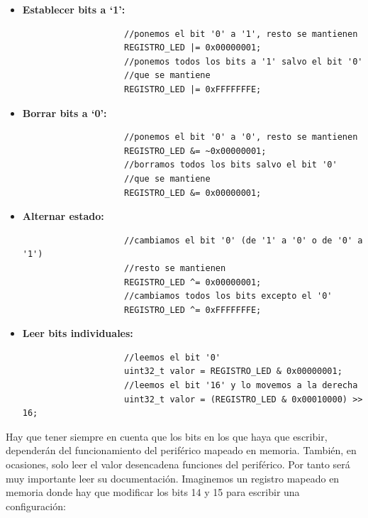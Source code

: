 \documentclass[../main.tex]{subfiles}
\begin{document}
        \begin{itemize}
            \item \textbf{Establecer bits a `1':}
                \begin{lstlisting}
                    //ponemos el bit '0' a '1', resto se mantienen
                    REGISTRO_LED |= 0x00000001;
                    //ponemos todos los bits a '1' salvo el bit '0'
                    //que se mantiene
                    REGISTRO_LED |= 0xFFFFFFFE;
                \end{lstlisting}

            \item \textbf{Borrar bits a `0':}
                \begin{lstlisting}
                    //ponemos el bit '0' a '0', resto se mantienen
                    REGISTRO_LED &= ~0x00000001;
                    //borramos todos los bits salvo el bit '0'
                    //que se mantiene
                    REGISTRO_LED &= 0x00000001;
                \end{lstlisting}

            \item \textbf{Alternar estado:}
                \begin{lstlisting}
                    //cambiamos el bit '0' (de '1' a '0' o de '0' a '1')
                    //resto se mantienen
                    REGISTRO_LED ^= 0x00000001;
                    //cambiamos todos los bits excepto el '0'
                    REGISTRO_LED ^= 0xFFFFFFFE;
                \end{lstlisting}

            \item \textbf{Leer bits individuales:}
                \begin{lstlisting}
                    //leemos el bit '0'
                    uint32_t valor = REGISTRO_LED & 0x00000001;
                    //leemos el bit '16' y lo movemos a la derecha
                    uint32_t valor = (REGISTRO_LED & 0x00010000) >> 16;
                \end{lstlisting}
        \end{itemize}

        Hay que tener siempre en cuenta que los bits en los que haya que escribir, dependerán del funcionamiento del periférico mapeado en memoria. También, en ocasiones, solo leer el valor desencadena funciones del periférico. Por tanto será muy importante leer su documentación. Imaginemos un registro mapeado en memoria donde hay que modificar los bits 14 y 15 para escribir una configuración:
\end{document}
